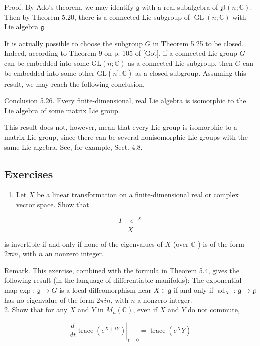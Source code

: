 \documentclass[10pt, letterpaper]{article}
\begin{document}
Proof. By Ado's theorem, we may identify $\mathfrak{g}$ with a real subalgebra of $\mathfrak{g l}(n ; \mathbb{C})$. Then by Theorem 5.20, there is a connected Lie subgroup of $\operatorname{GL}(n ; \mathbb{C})$ with Lie algebra $\mathfrak{g}$.

It is actually possible to choose the subgroup $G$ in Theorem 5.25 to be closed. Indeed, according to Theorem 9 on p. 105 of [Got], if a connected Lie group $G$ can be embedded into some $\mathrm{GL}(n ; \mathbb{C})$ as a connected Lie subgroup, then $G$ can be embedded into some other $\mathrm{GL}\left(n^{\prime} ; \mathbb{C}\right)$ as a closed subgroup. Assuming this result, we may reach the following conclusion.

Conclusion 5.26. Every finite-dimensional, real Lie algebra is isomorphic to the Lie algebra of some matrix Lie group.

This result does not, however, mean that every Lie group is isomorphic to a matrix Lie group, since there can be several nonisomorphic Lie groups with the same Lie algebra. See, for example, Sect. 4.8.

\subsection*{Exercises}
\begin{enumerate}
  \item Let $X$ be a linear transformation on a finite-dimensional real or complex vector space. Show that
\end{enumerate}

$$
\frac{I-e^{-X}}{X}
$$

is invertible if and only if none of the eigenvalues of $X$ (over $\mathbb{C}$ ) is of the form $2 \pi i n$, with $n$ an nonzero integer.

Remark. This exercise, combined with the formula in Theorem 5.4, gives the following result (in the language of differentiable manifolds): The exponential map exp : $\mathfrak{g} \rightarrow G$ is a local diffeomorphism near $X \in \mathfrak{g}$ if and only if $\operatorname{ad}_{X}$ : $\mathfrak{g} \rightarrow \mathfrak{g}$ has no eigenvalue of the form $2 \pi i n$, with $n$ a nonzero integer.\\
2. Show that for any $X$ and $Y$ in $M_{n}(\mathbb{C})$, even if $X$ and $Y$ do not commute,

$$
\left.\frac{d}{d t} \operatorname{trace}\left(e^{X+t Y}\right)\right|_{t=0}=\operatorname{trace}\left(e^{X} Y\right)
$$
\end{document}
